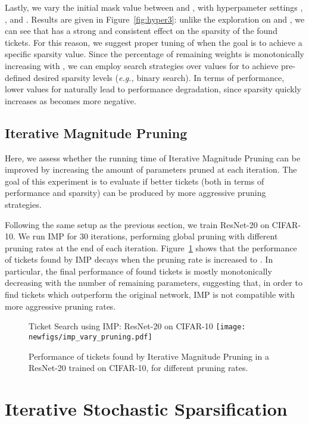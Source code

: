 \documentclass{article}
\newcommand{\eg}{\textit{e.g.,} }
\begin{document}
Lastly, we vary the initial mask value  between  and , with hyperpameter settings , , and . Results are given in Figure~\ref{fig:hyper3}: unlike the exploration on  and , we can see that  has a strong and consistent effect on the sparsity of the found tickets. For this reason, we suggest proper tuning of  when the goal is to achieve a specific sparsity value. Since the percentage of remaining weights is monotonically increasing with , we can employ search strategies over values for  to achieve pre-defined desired sparsity levels (\eg binary search). In terms of performance, lower values for  naturally lead to performance degradation, since sparsity quickly increases as  becomes more negative.

\newpage

\subsection{Iterative Magnitude Pruning}
\label{app:impanalysis}

Here, we assess whether the running time of Iterative Magnitude Pruning can be improved by increasing the amount of parameters pruned at each iteration. The goal of this experiment is to evaluate if better tickets (both in terms of performance and sparsity) can be produced by more aggressive pruning strategies.

Following the same setup as the previous section, we train ResNet-20 on CIFAR-10. We run IMP for 30 iterations, performing global pruning with different pruning rates at the end of each iteration. Figure~\ref{fig:hyper4} shows that the performance of tickets found by IMP decays when the pruning rate is increased to . In particular, the final performance of found tickets is mostly monotonically decreasing with the number of remaining parameters, suggesting that, in order to find tickets which outperform the original network, IMP is not compatible with more aggressive pruning rates.

\begin{figure}[!t]
    \centering
    \footnotesize{\textsf{Ticket Search using IMP: ResNet-20 on CIFAR-10}}
    \texttt{[image: newfigs/imp\_vary\_pruning.pdf]}
    \caption{Performance of tickets found by Iterative Magnitude Pruning in a ResNet-20 trained on CIFAR-10, for different pruning rates.}
    \label{fig:hyper4}
\end{figure}

\section{Iterative Stochastic Sparsification}
\label{app:iss}
\end{document}
